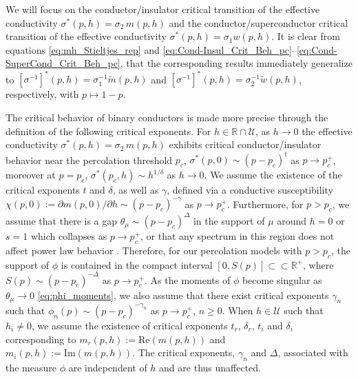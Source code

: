 \documentclass[english,12pt,jmp,graphicx]{revtex4-1}
\begin{document}
We will focus on the conductor/insulator critical transition of the
effective conductivity $\sigma^*(p,h)=\sigma_2\,m(p,h)$ and the
conductor/superconductor critical transition of the effective
conductivity $\sigma^*(p,h)=\sigma_1w(p,h)$. It is clear from equations
\eqref{eq:mh_Stieltjes_rep} and 
\eqref{eq:Cond-Insul_Crit_Beh_pc}--\eqref{eq:Cond-SuperCond_Crit_Beh_pc},
that the corresponding results immediately generalize to
$[\sigma^{-1}]^*(p,h)=\sigma_1^{-1}\tilde{m}(p,h)$ and
$[\sigma^{-1}]^*(p,h)=\sigma_2^{-1}\tilde{w}(p,h)$, respectively, with $p\mapsto1-p$. 

The critical behavior of binary conductors is made more precise
through the definition of the following critical exponents. For
$h\in\mathbb{R}\cap\mathcal{U}$, as $h\to0$ the effective conductivity
$\sigma^*(p,h)=\sigma_2\,m(p,h)$ exhibits critical conductor/insulator behavior
near the percolation threshold $p_c$, $\sigma^*(p,0)\sim(p-p_c)^t$ as
$p\to p_c^+$, moreover at $p=p_c$,
$\sigma^*(p_c,h)\sim h^{1/\delta}$ as $h\to0$. We assume the existence of the
critical exponents $t$ and $\delta$, as well as $\gamma$, defined via a
conductive susceptibility $\chi(p,0):=\partial m(p,0)/\partial h\sim(p-p_c)^{-\gamma}$ as
$p\to p_c^+$. Furthermore, for $p>p_c$, we assume that there is a gap 
$\theta_\mu\sim(p-p_c)^\Delta$ in the support of $\mu$ around $h=0$ or $s=1$ which
collapses as $p\to p_c^+$, or that any spectrum in this region does not
affect power law behavior \cite{Golden:PRL-3935}. Therefore, for our
percolation models with $p>p_c$, the support of $\phi$ is contained in
the compact interval $[0,S(p)]\subset\subset\mathbb{R}^+$, where $S(p)\sim(p-p_c)^{-\Delta}$ as
$p\to p_c^+$. As the moments of $\phi$ become singular as $\theta_\mu\to0$ 
\eqref{eq:phi_moments}, we also assume that there exist critical
exponents $\gamma_n$ such that $\phi_n(p)\sim(p-p_c)^{-\gamma_n}$ as $p\to p_c^+$,
$n\geq0$. When $h\in\mathcal{U}$ such that $h_i\neq0$, we
assume the existence of critical exponents $t_r$, $\delta_r$, $t_i$ and
$\delta_i$ corresponding to $m_r(p,h):=\text{Re}(m(p,h))$ and
$m_i(p,h):=\text{Im}(m(p,h))$. The critical exponents, $\gamma_n$ and $\Delta$,
associated with the measure $\phi$ are independent of $h$ and are thus
unaffected. 
\end{document}
